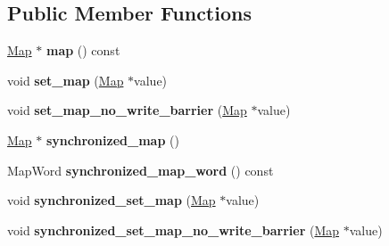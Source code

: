 \subsection*{Public Member Functions}
\begin{DoxyCompactItemize}
\item 
\hypertarget{classv8_1_1internal_1_1_heap_object_a5f10811ccf4f07be8349eba2f7265d9c}{}\hyperlink{classv8_1_1internal_1_1_map}{Map} $\ast$ {\bfseries map} () const \label{classv8_1_1internal_1_1_heap_object_a5f10811ccf4f07be8349eba2f7265d9c}

\item 
\hypertarget{classv8_1_1internal_1_1_heap_object_a238c1d2f833601734b2fb953fa8b4e0b}{}void {\bfseries set\+\_\+map} (\hyperlink{classv8_1_1internal_1_1_map}{Map} $\ast$value)\label{classv8_1_1internal_1_1_heap_object_a238c1d2f833601734b2fb953fa8b4e0b}

\item 
\hypertarget{classv8_1_1internal_1_1_heap_object_a09b55ec859f14abfa17b1112bf135632}{}void {\bfseries set\+\_\+map\+\_\+no\+\_\+write\+\_\+barrier} (\hyperlink{classv8_1_1internal_1_1_map}{Map} $\ast$value)\label{classv8_1_1internal_1_1_heap_object_a09b55ec859f14abfa17b1112bf135632}

\item 
\hypertarget{classv8_1_1internal_1_1_heap_object_aec25690bd5b29e515371699b01256c9a}{}\hyperlink{classv8_1_1internal_1_1_map}{Map} $\ast$ {\bfseries synchronized\+\_\+map} ()\label{classv8_1_1internal_1_1_heap_object_aec25690bd5b29e515371699b01256c9a}

\item 
\hypertarget{classv8_1_1internal_1_1_heap_object_a39c7cb7df22fd6bdfb33e26266620ed7}{}Map\+Word {\bfseries synchronized\+\_\+map\+\_\+word} () const \label{classv8_1_1internal_1_1_heap_object_a39c7cb7df22fd6bdfb33e26266620ed7}

\item 
\hypertarget{classv8_1_1internal_1_1_heap_object_aca15bae864522209d425f12d71d1c4dd}{}void {\bfseries synchronized\+\_\+set\+\_\+map} (\hyperlink{classv8_1_1internal_1_1_map}{Map} $\ast$value)\label{classv8_1_1internal_1_1_heap_object_aca15bae864522209d425f12d71d1c4dd}

\item 
\hypertarget{classv8_1_1internal_1_1_heap_object_a03f22b388bd784a49f4938ce1d944fd7}{}void {\bfseries synchronized\+\_\+set\+\_\+map\+\_\+no\+\_\+write\+\_\+barrier} (\hyperlink{classv8_1_1internal_1_1_map}{Map} $\ast$value)\label{classv8_1_1internal_1_1_heap_object_a03f22b388bd784a49f4938ce1d944fd7}


\end{DoxyCompactItemize}
